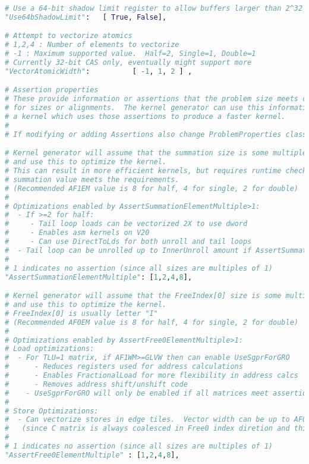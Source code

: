 \documentclass[]{article}
\begin{document}
\begin{lstlisting}[language=python,breaklines=true]
# Use a 64-bit shadow limit register to allow buffers larger than 2^32 bytes
"Use64bShadowLimit":   [ True, False],

# Attempt to vectorize atomics
# 1,2,4 : Number of elements to vectorize
# -1 : Maximum supported value.  Half=2, Single=1, Double=1
# Currently 32-bit CAS only, eventually might support more
"VectorAtomicWidth":          [ -1, 1, 2 ] ,

# Assertion properties
# These provide information or assertions that the problem size meets certain requirements
# for sizes or alignments.  The kernel generator can use this information to produce
# a kernel which uses those assertions to produce a faster kernel.
#
# If modifying or adding Assertions also change ProblemProperties class in TensileTypes.h

# Kernel generator will assume that the summation size is some multiple of the element size
# and use this to optimize the kernel.
# This can result in more efficient kernels, but requires runtime checking to ensure the specified
# summation value meets the requirements.
# (Recommended AF1EM value is 8 for half, 4 for single, 2 for double)
#
# Optimizations enabled by AssertSummationElementMultiple>1:
#  - If >=2 for half:
#     - Tail loop loads can be vectorized 2X to use dword
#     - Enables asm kernels on V20
#     - Can use DirectToLds for both unroll and tail loops
#  - Tail loop can be unrolled up to InnerUnroll amount if AssertSummationElementMultiple%InnerUnroll==0
#
# 1 indicates no assertion (since all sizes are multiples of 1)
"AssertSummationElementMultiple": [1,2,4,8],

# Kernel generator will assume that the FreeIndex[0] size is some multiple of the element size
# and use this to optimize the kernel.
# FreeIndex[0] is usually letter "I"
# (Recommended AF0EM value is 8 for half, 4 for single, 2 for double)
#
# Optimizations enabled by AssertFree0ElementMultiple>1:
# Load optimizations:
#  - For TLU=1 matrix, if AF1WM>=GLVW then can enable UseSgprForGRO
#      - Reduces registers used for address calculations
#      - Enables FractionalLoad for more flexibility in address calcs
#      - Removes address shift/unshift code
#    - UseSgprForGRO will only be enabled if all matrices meet assertion requirements.
#
# Store Optimizations:
#  - Can vectorize stores in edge tiles.  Vector width can be up to AF0EM.
#   (since C matrix is always coalesced in Free0 index diretion and this assertion guarantees the index element multiple)
#
# 1 indicates no assertion (since all sizes are multiples of 1)
"AssertFree0ElementMultiple" : [1,2,4,8],


\end{lstlisting}
\end{document}
